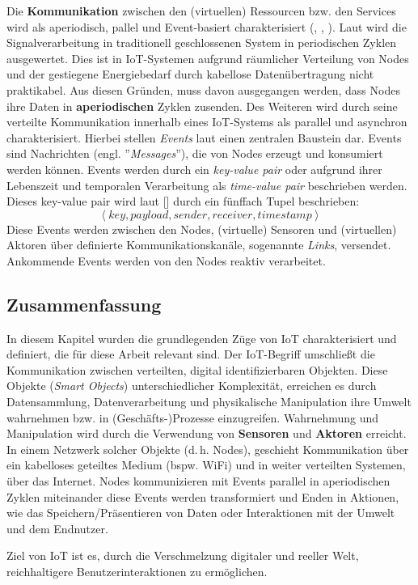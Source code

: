 Die \textbf{Kommunikation} zwischen den (virtuellen) Ressourcen bzw. den Services wird als aperiodisch, pallel und Event-basiert charakterisiert (\cite{serpanos2018iot}, \cite{laliwala2008event}, \cite{lan2014event}). Laut \cite{serpanos2018iot} wird die Signalverarbeitung in traditionell geschlossenen System in periodischen Zyklen ausgewertet. Dies ist in \ac{IoT}-Systemen aufgrund räumlicher Verteilung von Nodes und der gestiegene Energiebedarf durch kabellose Datenübertragung nicht praktikabel. Aus diesen Gründen, muss davon ausgegangen werden, dass Nodes ihre Daten in \textbf{aperiodischen} Zyklen zusenden. Des Weiteren wird durch seine verteilte Kommunikation innerhalb eines \ac{IoT}-Systems als parallel und asynchron charakterisiert. Hierbei stellen \textit{Events} laut \cite{serpanos2018iot} einen zentralen Baustein dar. Events sind Nachrichten (engl. ''\textit{Messages}''), die von Nodes erzeugt und konsumiert werden können. Events werden durch ein \textit{key-value pair} oder aufgrund ihrer Lebenszeit und temporalen Verarbeitung als \textit{time-value pair} beschrieben werden. Dieses key-value pair wird laut [\cite{serpanos2018iot}] durch ein fünffach Tupel beschrieben:
\begin{equation}
    \left \langle key, payload, sender, receiver, timestamp \right \rangle
\end{equation}
Diese Events werden zwischen den Nodes, (virtuelle) Sensoren und (virtuellen) Aktoren über definierte Kommunikationskanäle, sogenannte \textit{Links}, versendet. Ankommende Events werden von den Nodes reaktiv verarbeitet.

\subsection{Zusammenfassung}
In diesem Kapitel wurden die grundlegenden Züge von \ac{IoT} charakterisiert und definiert, die für diese Arbeit relevant sind. Der \ac{IoT}-Begriff umschließt die Kommunikation zwischen verteilten, digital identifizierbaren Objekten. Diese Objekte (\textit{Smart Objects}) unterschiedlicher Komplexität, erreichen es durch Datensammlung, Datenverarbeitung und physikalische Manipulation ihre Umwelt wahrnehmen bzw. in (Geschäfts-)Prozesse einzugreifen. Wahrnehmung und Manipulation wird durch die Verwendung von \textbf{Sensoren} und \textbf{Aktoren} erreicht. In einem Netzwerk solcher Objekte (d.\,h. Nodes), geschieht Kommunikation über ein kabelloses geteiltes Medium (bspw. WiFi) und in weiter verteilten Systemen, über das Internet. Nodes kommunizieren mit Events parallel in aperiodischen Zyklen miteinander diese Events werden transformiert und Enden in Aktionen, wie das Speichern/Präsentieren von Daten oder Interaktionen mit der Umwelt und dem Endnutzer.

Ziel von \ac{IoT} ist es, durch die Verschmelzung digitaler und reeller Welt, reichhaltigere Benutzerinteraktionen zu ermöglichen.